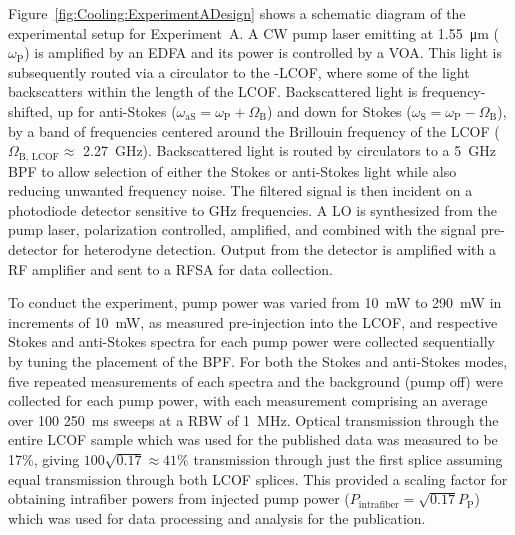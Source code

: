 Figure~\ref{fig:Cooling:ExperimentADesign} shows a schematic diagram of the experimental setup for Experiment~A. A \ac{CW} pump laser emitting at \SI{1.55}{\micro\meter} (\(\omega_{\mathrm{P}}\)) is amplified by an \ac{EDFA} and its power is controlled by a \ac{VOA}. This light is subsequently routed via a circulator to the -\ac{LCOF}, where some of the light backscatters within the length of the \ac{LCOF}. Backscattered light is frequency-shifted, up for anti-Stokes (\(\omega_{\mathrm{aS}} = \omega_{\mathrm{P}} + \Omega_{\mathrm{B}}\)) and down for Stokes
(\(\omega_{\mathrm{S}} = \omega_{\mathrm{P}} - \Omega_{\mathrm{B}}\)),
by a band of frequencies centered around the Brillouin frequency of the \ac{LCOF} (\(\Omega_{\mathrm{B,\,LCOF}} \approx\) \SI{2.27}{\giga\hertz}). Backscattered light is routed by circulators to a \SI{5}{\giga\hertz} \ac{BPF} to allow selection of either the Stokes or anti-Stokes light while also reducing unwanted frequency noise. The filtered signal is then incident on a photodiode detector sensitive to \si{\giga\hertz} frequencies. A \ac{LO} is synthesized from the pump laser, polarization controlled, amplified, and combined with the signal pre-detector for heterodyne detection. Output from the detector is amplified with a \ac{RF} amplifier and sent to a \ac{RFSA} for data collection.

To conduct the experiment, pump power was varied from \SI{10}{\milli\watt} to \SI{290}{\milli\watt} in increments of \SI{10}{\milli\watt}, as measured pre-injection into the \ac{LCOF}, and respective Stokes and anti-Stokes spectra for each pump power were collected sequentially by tuning the placement of the \ac{BPF}. For both the Stokes and anti-Stokes modes, five repeated measurements of each spectra and the background (pump off) were collected for each pump power, with each measurement comprising an average over 100 \SI{250}{\milli\second} sweeps at a \ac{RBW} of \SI{1}{\mega\hertz}. Optical transmission through the entire \ac{LCOF} sample which was used for the published data was measured to be 17\%, giving \(100\sqrt{0.17} \approx 41\%\) transmission through just the first splice assuming equal transmission through both \ac{LCOF} splices. This provided a scaling factor for obtaining intrafiber powers from injected pump power (\(P_{\mathrm{intrafiber}} = \sqrt{0.17}P_{\mathrm{P}}\)) which was used for data processing and analysis for the publication.

